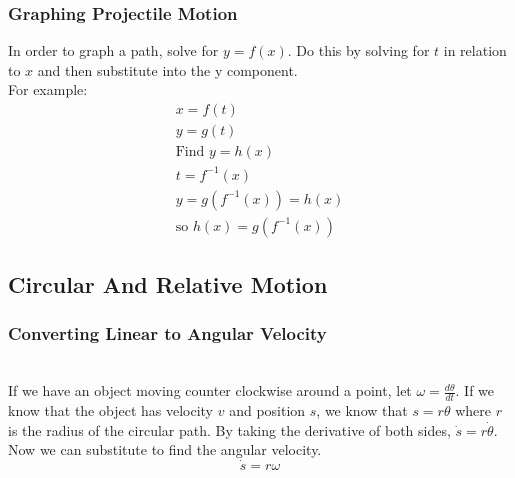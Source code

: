 \documentclass[../Notes.tex]{subfiles}
\begin{document}
\subsubsection{Graphing Projectile Motion}
In order to graph a path, solve for $y = f(x)$. Do this by solving for $t$ in relation to $x$ and 
then substitute into the y component. \\
For example: 
\begin{align*}
x = f(t) \\
y = g(t) \\
\text{Find } y = h(x) \\
t = f^{-1}(x) \\
y = g(f^{-1}(x)) = h(x) \\
\text{so } h(x) = g(f^{-1}(x))
\end{align*}

\subsection{Circular And Relative Motion}
\subsubsection{Converting Linear to Angular Velocity} \mbox{}\\
If we have an object moving counter clockwise around a point, let $\omega = \frac{d \theta}{dt}$. If
we know that the object has velocity $v$ and position $s$, we know that $s=r\theta$ where $r$ is the
radius of the circular path. By taking the derivative of both sides, $\dot{s} = r \dot{\theta}$. 
Now we can substitute to find the angular velocity.
\begin{equation*}
\dot{s} = r \omega
\end{equation*}
\end{document}
